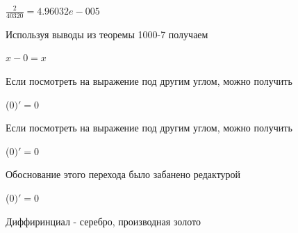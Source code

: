 \documentclass[12pt,a4paper,fleqn]{article}
\begin{document}
\begin{center}
\begin{center}
\begin{center}
\begin{center}
\begin{center}
\begin{center}
\begin{center}
\begin{center}
\begin{center}
\begin{center}
\begin{center}
\begin{center}
\begin{center}
\begin{center}
\begin{center}
\begin{center}
\begin{center}
\begin{center}
\begin{center}
\begin{center}
\begin{center}
\begin{center}
\begin{center}
\begin{center}
\begin{center}
\begin{center}
\begin{center}
\begin{center}
\begin{center}
\begin{center}
\begin{center}
\begin{center}
\begin{center}
\begin{center}
\begin{center}
\begin{center}
\begin{center}
\begin{center}
\begin{center}
\begin{center}
\begin{center}
\begin{center}
\begin{center}
\begin{center}
\begin{center}
\begin{center}
\begin{center}
\begin{center}
\begin{center}
\begin{center}
\begin{center}
\begin{center}
\begin{center}
\begin{center}
\begin{center}
\begin{center}
\begin{center}
\begin{center}
\begin{center}
\begin{center}
\begin{center}
\begin{center}
\begin{center}
\begin{center}
\begin{center}
\begin{center}
\begin{center}
\begin{center}
\begin{center}
\begin{center}
\begin{center}
\begin{center}
\begin{center}
\begin{center}
\begin{center}
\begin{center}
\begin{center}
\begin{center}
\begin{center}
\begin{center}
\begin{center}$\frac{2}{40320} = 4.96032e-005$\end{center}
Используя выводы из теоремы 1000-7 получаем

\begin{center}
$x-0 = x$\end{center}
Если посмотреть на выражение под другим углом, можно получить

\begin{center}
 ($0)'
  = 0$\end{center}
Если посмотреть на выражение под другим углом, можно получить

\begin{center}
 ($0)'
  = 0$\end{center}
Обоснование этого перехода было забанено редактурой

\begin{center}
 ($0)'
  = 0$\end{center}
Диффиринциал - серебро, производная золото\cite{link2}


\end{center}
\end{center}
\end{center}
\end{center}
\end{center}
\end{center}
\end{center}
\end{center}
\end{center}
\end{center}
\end{center}
\end{center}
\end{center}
\end{center}
\end{center}
\end{center}
\end{center}
\end{center}
\end{center}
\end{center}
\end{center}
\end{center}
\end{center}
\end{center}
\end{center}
\end{center}
\end{center}
\end{center}
\end{center}
\end{center}
\end{center}
\end{center}
\end{center}
\end{center}
\end{center}
\end{center}
\end{center}
\end{center}
\end{center}
\end{center}
\end{center}
\end{center}
\end{center}
\end{center}
\end{center}
\end{center}
\end{center}
\end{center}
\end{center}
\end{center}
\end{center}
\end{center}
\end{center}
\end{center}
\end{center}
\end{center}
\end{center}
\end{center}
\end{center}
\end{center}
\end{center}
\end{center}
\end{center}
\end{center}
\end{center}
\end{center}
\end{center}
\end{center}
\end{center}
\end{center}
\end{center}
\end{center}
\end{center}
\end{center}
\end{center}
\end{center}
\end{center}
\end{center}
\end{center}
\end{center}
\end{document}
